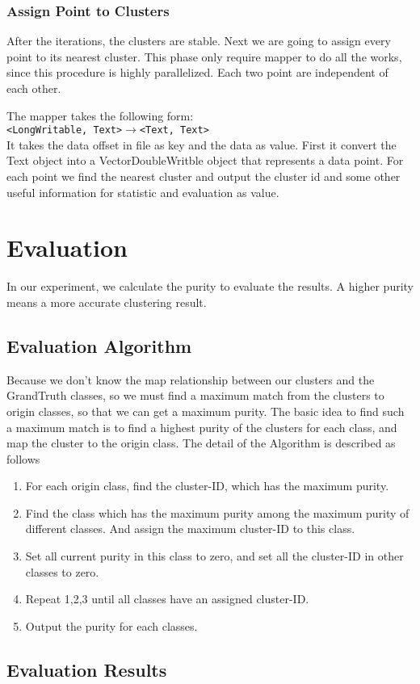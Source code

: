 \documentclass[a4paper,11pt]{article}
\begin{document}
\subsubsection{Assign Point to Clusters}
After the iterations, the clusters are stable. Next we are going to assign every
point to its nearest cluster. This phase only require mapper to do all the
works, since this procedure is highly parallelized. Each two point are
independent of each other.

The mapper takes the following form:\\
\verb|<LongWritable, Text>|$\rightarrow$\verb|<Text, Text>|\\
It takes the data offset in file as key and the data as value. First it convert
the Text object into a VectorDoubleWritble object that represents a data point.
For each point we find the nearest cluster and output the cluster id and some
other useful information for statistic and evaluation as value.


\section{Evaluation}
In our experiment, we calculate the purity to evaluate the results. A higher purity means a more accurate clustering result.
\subsection{Evaluation Algorithm}
Because we don't know the map relationship between our clusters and the GrandTruth classes, so we must find a maximum match from the clusters to origin classes, so that we can get a maximum purity.
The basic idea to find such a maximum match is to find a highest purity of the clusters for each class, and map the cluster to the origin class.
The detail of the Algorithm is described as follows
\begin{enumerate}
  \item For each origin class, find the cluster-ID, which has the maximum purity.  	
  \item Find the class which has the maximum purity among the maximum purity of different classes. And assign the maximum cluster-ID to this class.
  \item Set all current purity in this class to zero, and set all the cluster-ID in other classes to zero.
  \item Repeat 1,2,3 until all classes have an assigned cluster-ID.
  \item Output the purity for each classes.
\end{enumerate}
\subsection{Evaluation Results}



\end{document}
